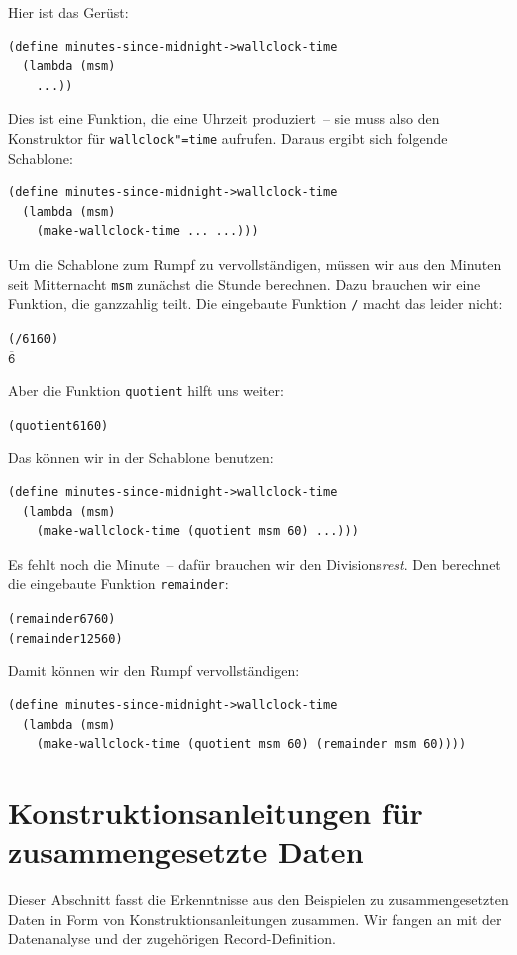 %
Hier ist das Gerüst:
%
\begin{verbatim}
(define minutes-since-midnight->wallclock-time
  (lambda (msm)
    ...))
\end{verbatim}
%
Dies ist eine Funktion, die eine Uhrzeit produziert~-- sie muss also
den Konstruktor für \texttt{wallclock"=time} aufrufen.  Daraus ergibt
sich folgende Schablone:
%
\begin{verbatim}
(define minutes-since-midnight->wallclock-time
  (lambda (msm)
    (make-wallclock-time ... ...)))
\end{verbatim}
% 
Um die Schablone zum Rumpf zu vervollständigen, müssen wir aus den
Minuten seit Mitternacht \texttt{msm} zunächst die Stunde berechnen.
Dazu brauchen wir eine Funktion, die ganzzahlig teilt.  Die eingebaute
Funktion \texttt{/} macht das leider nicht:
%
\begin{alltt}
(/ 61 60)
\(\overline{\mathtt{6}}\)
\end{alltt}
%
Aber die Funktion \texttt{quotient} hilft uns weiter:
%
\begin{alltt}
(quotient 61 60)
\end{alltt}
%
Das können wir in der Schablone benutzen:
%
\begin{verbatim}
(define minutes-since-midnight->wallclock-time
  (lambda (msm)
    (make-wallclock-time (quotient msm 60) ...)))
\end{verbatim}
%
Es fehlt noch die Minute~-- dafür brauchen wir den
Divisions\emph{rest}.  Den berechnet die eingebaute Funktion
\texttt{remainder}:
%
\begin{alltt}
(remainder 67 60)
(remainder 125 60)
\end{alltt}
%
Damit können wir den Rumpf vervollständigen:
%
\begin{verbatim}
(define minutes-since-midnight->wallclock-time
  (lambda (msm)
    (make-wallclock-time (quotient msm 60) (remainder msm 60))))
\end{verbatim}

\section{Konstruktionsanleitungen für zusammengesetzte Daten}

Dieser Abschnitt fasst die Erkenntnisse aus den Beispielen
zu zusammengesetzten Daten in Form von Konstruktionsanleitungen
zusammen.  Wir fangen an mit der Datenanalyse und der zugehörigen
Record-Definition.

